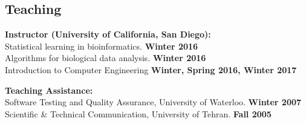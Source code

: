 \documentclass[margin,line,letterpaper]{resume}
\begin{document}
\begin{resume}


    \section{\mysidestyle Teaching}

    \textbf{Instructor (University of California, San Diego):}\vspace{2mm}\\\vspace{1mm}%
     Statistical learning in bioinformatics. \hfill \textbf{Winter 2016}\\
      Algorithms for biological data analysis. \hfill \textbf{Winter 2016}\\
    Introduction to Computer Engineering  \hfill \textbf{Winter, Spring 2016, Winter 2017}


    \textbf{Teaching  Assistance:}\vspace{2mm}\\\vspace{1mm}%
    Software Testing and Quality Assurance, University of Waterloo.  \hfill \textbf{Winter 2007}\\
    Scientific \& Technical Communication, University of Tehran.  \hfill \textbf{Fall 2005}



\end{resume}
\end{document}
